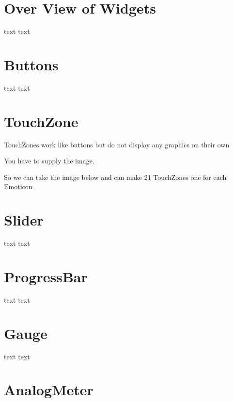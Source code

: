 \hypertarget{intro_widgets_overView}{}\section{Over View of Widgets}\label{intro_widgets_overView}
text text\par
 \hypertarget{intro_widgets_buttons}{}\section{Buttons}\label{intro_widgets_buttons}
text text\par
 

 \hypertarget{intro_widgets_touchZone}{}\section{Touch\-Zone}\label{intro_widgets_touchZone}
Touch\-Zones work like buttons but do not display any graphics on their own\par
 You have to supply the image.\par
 So we can take the image below and can make 21 Touch\-Zones one for each Emoticon\par
  \hypertarget{intro_widgets_slider}{}\section{Slider}\label{intro_widgets_slider}
text text\par
 \hypertarget{intro_widgets_progressBar}{}\section{Progress\-Bar}\label{intro_widgets_progressBar}
text text\par
 \hypertarget{intro_widgets_gauge}{}\section{Gauge}\label{intro_widgets_gauge}
 

text text\par
 \hypertarget{intro_widgets_analogMeter}{}\section{Analog\-Meter}\label{intro_widgets_analogMeter}
 

